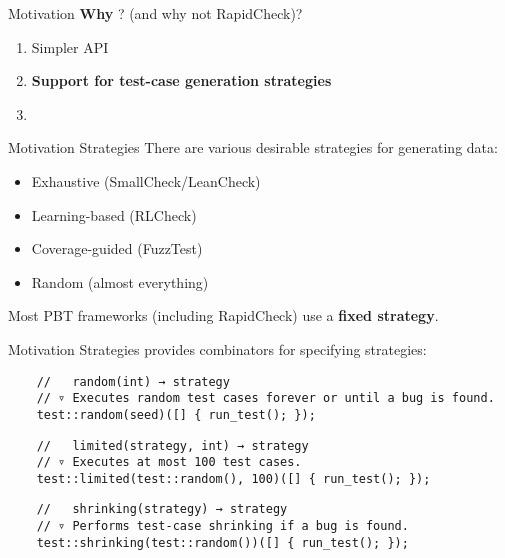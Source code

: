 \begin{frame}{\halcheck{} \textemdash{} Motivation}
  \textbf{Why} \halcheck{}? (and why not RapidCheck)?

  \begin{enumerate}
    \item Simpler API
    \item \textbf{Support for test-case generation strategies}
    \item
  \end{enumerate}
\end{frame}

\begin{frame}{\halcheck{} \textemdash{} Motivation \textemdash{} Strategies}
  There are various desirable strategies for generating data:
  \begin{itemize}
    \item Exhaustive (SmallCheck/LeanCheck)
    \item Learning-based (RLCheck)
    \item Coverage-guided (FuzzTest)
    \item Random (almost everything)
  \end{itemize}

  Most PBT frameworks (including RapidCheck) use a \textbf{fixed strategy}.
\end{frame}

\begin{frame}[fragile]{\halcheck{} \textemdash{} Motivation \textemdash{} Strategies}
  \halcheck{} provides combinators for specifying strategies:

  \begin{verbatim}
    //   random(int) → strategy
    // ▿ Executes random test cases forever or until a bug is found.
    test::random(seed)([] { run_test(); });
  \end{verbatim}

  \pause{}

  \begin{verbatim}
    //   limited(strategy, int) → strategy
    // ▿ Executes at most 100 test cases.
    test::limited(test::random(), 100)([] { run_test(); });
  \end{verbatim}

  \pause{}

  \begin{verbatim}
    //   shrinking(strategy) → strategy
    // ▿ Performs test-case shrinking if a bug is found.
    test::shrinking(test::random())([] { run_test(); });
  \end{verbatim}
\end{frame}

